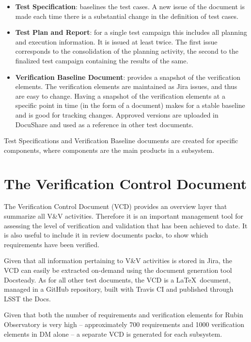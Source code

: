 \begin{itemize}
\item \textbf{Test Specification}:  baselines the test cases.
A new issue of the document is made each time there is a substantial change in the definition of test cases.
\item \textbf{Test Plan and Report}:  for a single test campaign this includes all planning and execution information.
It is issued at least twice. The first issue corresponds to the consolidation of the planning activity,
the second to the finalized test campaign containing the results of the same.
\item \textbf{Verification Baseline Document}: provides a snapshot of the verification elements.
The verification elements are  maintained as Jira issues, and  thus are easy to change.
Having a snapshot of the verification elements at a specific point in time  (in the form of a document) makes
for a stable baseline and is good for tracking changes.
Approved versions are uploaded in DocuShare and used as a reference in other test documents.
\end{itemize}

Test Specifications and Verification Baseline documents are created for specific components, where components are the main products in a subsystem.


\section{The Verification Control Document}
\label{sec:vcd}

The Verification Control Document (VCD) provides an overview layer that summarize all V\&V activities.
Therefore it is an important management tool for assessing the level of verification and validation that has been achieved to date.
It is also useful to include it in review documents packs, to show which requirements have been verified.

Given that all information pertaining to V\&V activities is stored in Jira, the VCD can easily be extracted on-demand using the document generation tool Docsteady.
As for all other test documents, the VCD is a \LaTeX~document, managed in a GitHub repository, built with Travis CI and published through LSST the Docs.

Given that both the number of requirements and verification elements for Rubin Observatory is very high --
approximately 700 requirements and 1000 verification elements in DM alone -- a separate VCD is generated for each subsystem.

